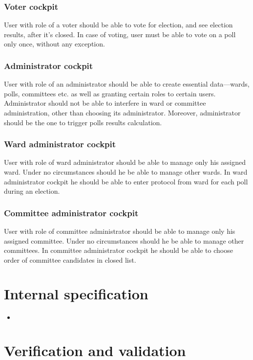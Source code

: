 \documentclass[a4paper,twoside,12pt]{book}
\begin{document}
    \subsection{Voter cockpit}
    User with role of a voter should be able to vote for election, and see election results, after it's closed.
    In case of voting, user must be able to vote on a poll only once, without any exception.

    \subsection{Administrator cockpit}
    User with role of an administrator should be able to create essential data---wards, polls, committees etc. as well as granting certain roles to certain users.
    Administrator should not be able to interfere in ward or committee administration, other than choosing its administrator.
    Moreover, administrator should be the one to trigger polls results calculation.

    \subsection{Ward administrator cockpit}
    User with role of ward administrator should be able to manage only his assigned ward. Under no circumstances should he be able to manage other wards.
    In ward administrator cockpit he should be able to enter protocol from ward for each poll during an election.

    \subsection{Committee administrator cockpit}
    User with role of committee administrator should be able to manage only his assigned committee. Under no circumstances should he be able to manage other committees.
    In committee administrator cockpit he should be able to choose order of committee candidates in closed list. 


\chapter{Internal specification}

\begin{itemize}
\item 
\end{itemize}



\chapter{Verification and validation}
\end{document}
